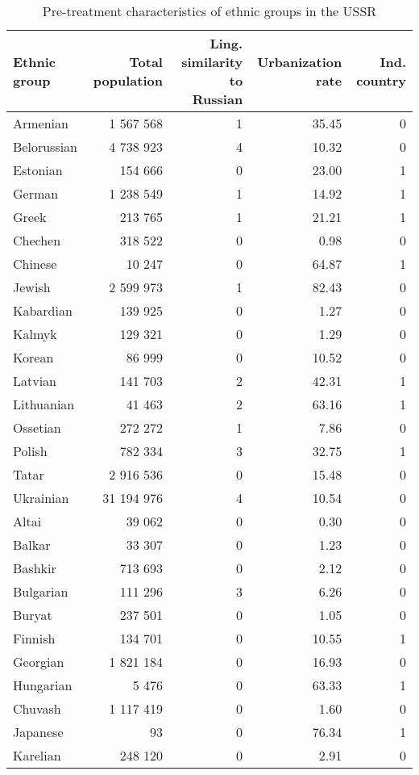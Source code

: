 \begin{table}[!h]

\caption{\label{tab:sc_predictors}Pre-treatment characteristics of ethnic groups in the USSR}
\centering
\begin{threeparttable}
\begin{tabular}{lrrrr}
\toprule
Ethnic group & Total population & Ling. similarity to Russian & Urbanization rate & Ind. country\\
\midrule
Armenian & 1 567 568 & 1 & 35.45 & 0\\
Belorussian & 4 738 923 & 4 & 10.32 & 0\\
Estonian & 154 666 & 0 & 23.00 & 1\\
German & 1 238 549 & 1 & 14.92 & 1\\
Greek & 213 765 & 1 & 21.21 & 1\\
Chechen & 318 522 & 0 & 0.98 & 0\\
Chinese & 10 247 & 0 & 64.87 & 1\\
Jewish & 2 599 973 & 1 & 82.43 & 0\\
Kabardian & 139 925 & 0 & 1.27 & 0\\
Kalmyk & 129 321 & 0 & 1.29 & 0\\
Korean & 86 999 & 0 & 10.52 & 0\\
Latvian & 141 703 & 2 & 42.31 & 1\\
Lithuanian & 41 463 & 2 & 63.16 & 1\\
Ossetian & 272 272 & 1 & 7.86 & 0\\
Polish & 782 334 & 3 & 32.75 & 1\\
Tatar & 2 916 536 & 0 & 15.48 & 0\\
Ukrainian & 31 194 976 & 4 & 10.54 & 0\\
Altai & 39 062 & 0 & 0.30 & 0\\
Balkar & 33 307 & 0 & 1.23 & 0\\
Bashkir & 713 693 & 0 & 2.12 & 0\\
Bulgarian & 111 296 & 3 & 6.26 & 0\\
Buryat & 237 501 & 0 & 1.05 & 0\\
Finnish & 134 701 & 0 & 10.55 & 1\\
Georgian & 1 821 184 & 0 & 16.93 & 0\\
Hungarian & 5 476 & 0 & 63.33 & 1\\
Chuvash & 1 117 419 & 0 & 1.60 & 0\\
Japanese & 93 & 0 & 76.34 & 1\\
Karelian & 248 120 & 0 & 2.91 & 0\\

\end{tabular}
\end{threeparttable}
\end{table}
